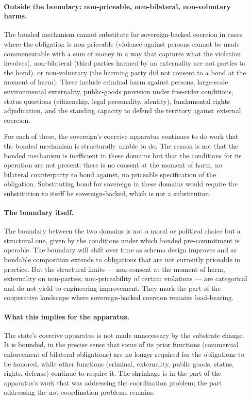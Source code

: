 \documentclass[11pt,a4paper]{article}
\theoremstyle{remark}
\begin{document}
\paragraph{Outside the boundary: non-priceable, non-bilateral, non-voluntary harms.}
The bonded mechanism cannot substitute for sovereign-backed
coercion in cases where the obligation is non-priceable
(violence against persons cannot be made commensurable with a
sum of money in a way that captures what the violation
involves), non-bilateral (third parties harmed by an externality
are not parties to the bond), or non-voluntary (the harming
party did not consent to a bond at the moment of harm). These
include criminal harm against persons, large-scale environmental
externality, public-goods provision under free-rider conditions,
status questions (citizenship, legal personality, identity),
fundamental rights adjudication, and the standing capacity to
defend the territory against external coercion.

For each of these, the sovereign's coercive apparatus continues
to do work that the bonded mechanism is structurally unable to
do. The reason is not that the bonded mechanism is inefficient
in these domains but that the conditions for its operation are
not present: there is no consent at the moment of harm, no
bilateral counterparty to bond against, no priceable
specification of the obligation. Substituting bond for sovereign
in these domains would require the substitution to itself be
sovereign-backed, which is not a substitution.

\paragraph{The boundary itself.}
The boundary between the two domains is not a moral or political
choice but a structural one, given by the conditions under which
bonded pre-commitment is operable. The boundary will shift over
time as schema design improves and as bondable composition
extends to obligations that are not currently priceable in
practice. But the structural limits --- non-consent at the moment
of harm, externality on non-parties, non-priceability of certain
violations --- are categorical and do not yield to engineering
improvement. They mark the part of the cooperative landscape
where sovereign-backed coercion remains load-bearing.

\paragraph{What this implies for the apparatus.}
The state's coercive apparatus is not made unnecessary by the
substrate change. It is bounded, in the precise sense that some
of its prior functions (commercial enforcement of bilateral
obligations) are no longer required for the obligations to be
honored, while other functions (criminal, externality, public
goods, status, rights, defense) continue to require it. The
shrinkage is in the part of the apparatus's work that was
addressing the coordination problem; the part addressing the
not-coordination problems remains.
\end{document}

